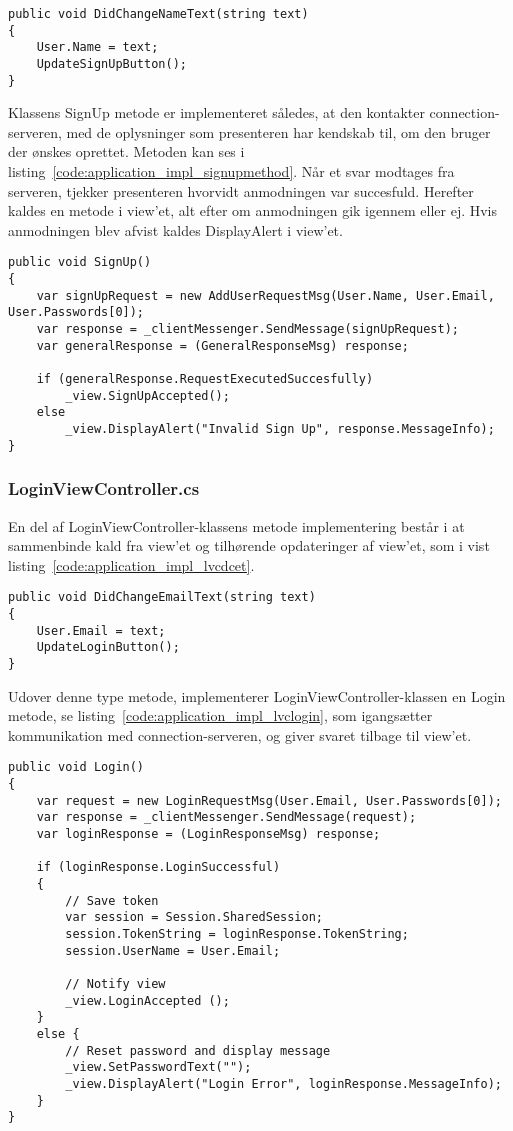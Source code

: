 \begin{lstlisting}[caption={DidChangeNameText(...)},label={code:application_impl_signupviewc1}]
public void DidChangeNameText(string text)
{
	User.Name = text;
	UpdateSignUpButton();
}
\end{lstlisting}

Klassens SignUp metode er implementeret således, at den kontakter connection-serveren, med de oplysninger som presenteren har kendskab til, om den bruger der ønskes oprettet. Metoden kan ses i listing~\ref{code:application_impl_signupmethod}. Når et svar modtages fra serveren, tjekker presenteren hvorvidt anmodningen var succesfuld. Herefter kaldes en metode i view'et, alt efter om anmodningen gik igennem eller ej. Hvis anmodningen blev afvist kaldes DisplayAlert i view'et.

\begin{lstlisting}[caption={SignUp()},label={code:application_impl_signupmethod}]
public void SignUp()
{
	var signUpRequest = new AddUserRequestMsg(User.Name, User.Email, User.Passwords[0]);
	var response = _clientMessenger.SendMessage(signUpRequest);
	var generalResponse = (GeneralResponseMsg) response;

	if (generalResponse.RequestExecutedSuccesfully)
		_view.SignUpAccepted();
	else
		_view.DisplayAlert("Invalid Sign Up", response.MessageInfo);
}
\end{lstlisting}

\subsubsection{LoginViewController.cs}
En del af LoginViewController-klassens metode implementering består i at sammenbinde kald fra view'et og tilhørende opdateringer af view'et, som i vist listing~\ref{code:application_impl_lvcdcet}.

\begin{lstlisting}[caption={DidChangeEmailText(...)},label={code:application_impl_lvcdcet}]
public void DidChangeEmailText(string text)
{
	User.Email = text;
	UpdateLoginButton();
}
\end{lstlisting}

Udover denne type metode, implementerer LoginViewController-klassen en Login metode, se listing~\ref{code:application_impl_lvclogin}, som igangsætter kommunikation med connection-serveren, og giver svaret tilbage til view'et. 

\begin{lstlisting}[caption={Login()},label={code:application_impl_lvclogin}]
 public void Login()
{
	var request = new LoginRequestMsg(User.Email, User.Passwords[0]);
	var response = _clientMessenger.SendMessage(request);
	var loginResponse = (LoginResponseMsg) response;

	if (loginResponse.LoginSuccessful)
	{
		// Save token
		var session = Session.SharedSession;
		session.TokenString = loginResponse.TokenString;
		session.UserName = User.Email;

		// Notify view
		_view.LoginAccepted (); 
	}
	else {
		// Reset password and display message
		_view.SetPasswordText("");
		_view.DisplayAlert("Login Error", loginResponse.MessageInfo);
	}
}
\end{lstlisting}

